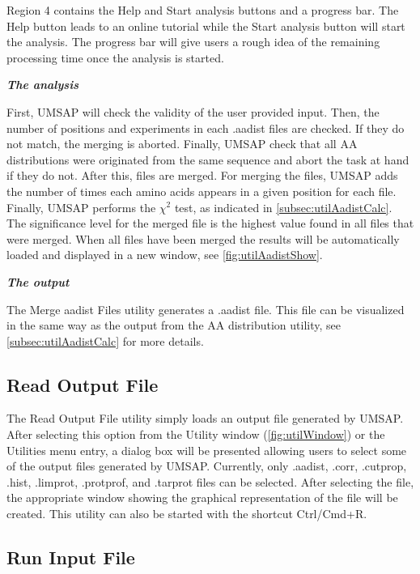 Region \num{4} contains the Help and Start analysis buttons and a progress bar. The Help button leads to an online tutorial while the Start analysis button will start the analysis. The progress bar will give users a rough idea of the remaining processing time once the analysis is started.

\textit{\textbf{The analysis}}

First, UMSAP will check the validity of the user provided input. Then, the number of positions and experiments in each .aadist files are checked. If they do not match, the merging is aborted. Finally, UMSAP check that all AA distributions were originated from the same sequence and abort the task at hand if they do not. After this, files are merged. For merging the files, UMSAP adds the number of times each amino acids appears in a given position for each file. Finally, UMSAP performs the $\chi^2$ test, as indicated in \autoref{subsec:utilAadistCalc}. The significance level for the merged file is the highest value found in all files that were merged. When all files have been merged the results will be automatically loaded and displayed in a new window, see \autoref{fig:utilAadistShow}. 

\textit{\textbf{The output}} 

The Merge aadist Files utility generates a .aadist file. This file can be visualized in the same way as the output from the AA distribution utility, see \autoref{subsec:utilAadistCalc} for more details.

\subsection{Read Output File}
\label{subsec:utilReadOutF}

The Read Output File utility simply loads an output file generated by UMSAP. After selecting this option from the Utility window (\autoref{fig:utilWindow}) or the Utilities menu entry, a dialog box will be presented allowing users to select some of the output files generated by UMSAP. Currently, only .aadist, .corr, .cutprop, .hist, .limprot, .protprof, and .tarprot files can be selected. After selecting the file, the appropriate window showing the graphical representation of the file will be created. This utility can also be started with the shortcut Ctrl/Cmd+R.

\subsection{Run Input File}
\label{subsec:utilReadUscr}

